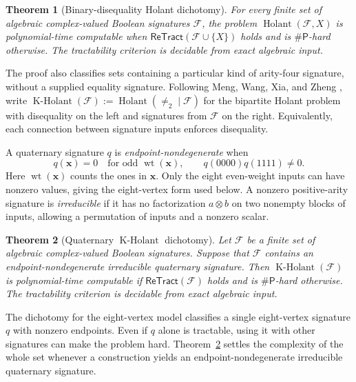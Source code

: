 \documentclass[11pt,letterpaper,onecolumn]{article}
\theoremstyle{plain}
\newtheorem{theorem}{Theorem}[section]
\theoremstyle{definition}
\theoremstyle{remark}
\newcommand{\cF}{\mathcal F}
\newcommand{\Holant}{\operatorname{Holant}}
\newcommand{\KHolant}{\operatorname{K\text{-}Holant}}
\newcommand{\ReTract}{\mathsf{ReTract}}
\newcommand{\SharpP}{\#\mathsf P}
\newcommand{\wt}{\operatorname{wt}}
\newcommand{\Neq}{\neq}
\begin{document}
\begin{theorem}[Binary-disequality Holant dichotomy]
\label{s:thm:p1-deq2-dichotomy}
For every finite set of algebraic complex-valued Boolean signatures \(\cF\),
the problem \(\Holant(\cF,X)\) is polynomial-time computable when
\(\ReTract(\cF\cup\{X\})\) holds and is \(\SharpP\)-hard otherwise.
The tractability criterion is decidable from exact algebraic input.
\end{theorem}

The proof also classifies sets containing a particular kind of
arity-four signature, without a supplied equality signature.  Following Meng, Wang, Xia, and Zheng
\cite{MengWangXiaZheng2025}, write
\(\KHolant(\cF):=\Holant(\Neq_2\mid\cF)\) for the bipartite Holant
problem with disequality on the left and signatures from \(\cF\) on the
right.  Equivalently, each connection between signature inputs enforces
disequality.

A quaternary signature \(q\) is
\emph{endpoint-nondegenerate} when
\[
 q({\mathbf{x}})=0\quad\text{for odd }\wt({\mathbf{x}}),\qquad q(0000)q(1111)\ne0.
\]
Here \(\wt(\mathbf{x})\) counts the ones in \(\mathbf{x}\). Only the
eight even-weight inputs can have nonzero values, giving the eight-vertex
form used below.
A nonzero positive-arity signature is \emph{irreducible} if it has no factorization
\(a\otimes b\) on two nonempty blocks of inputs, allowing a permutation of inputs and a nonzero scalar.

\begin{theorem}[Quaternary \(\KHolant\) dichotomy]
\label{s:thm:p1-quaternary-kholant-dichotomy}
Let \(\cF\) be a finite set of algebraic complex-valued Boolean signatures.
Suppose that \(\cF\) contains an endpoint-nondegenerate irreducible
quaternary signature.  Then \(\KHolant(\cF)\) is polynomial-time computable
if \(\ReTract(\cF)\) holds and is \(\SharpP\)-hard otherwise.  The
tractability criterion is decidable from exact algebraic input.
\end{theorem}


The dichotomy for the eight-vertex model
\cite[arXiv version~2, Theorem~3.1]{CaiFu2023} classifies a single
eight-vertex signature \(q\) with nonzero endpoints. Even if \(q\) alone
is tractable, using it with other signatures can make the problem hard.
Theorem~\ref{s:thm:p1-quaternary-kholant-dichotomy} settles the complexity
of the whole set whenever a construction yields an endpoint-nondegenerate
irreducible quaternary signature.
\end{document}
